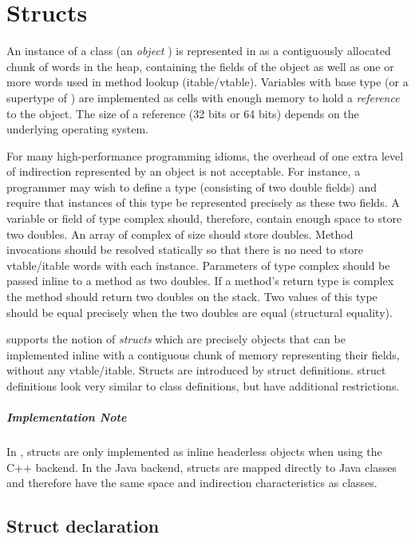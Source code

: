 \chapter{Structs}
\label{XtenStructs}
\label{StructClasses}
\label{Structs}

An instance of a class  (an \emph{object} ) is represented in \Xten{} as
a contiguously allocated chunk of words in the heap, containing the
fields of the object as well as one or more words used in method
lookup (itable/vtable). Variables with base type  (or a supertype of
) are implemented as cells with enough memory to hold a
\emph{reference} to the object. The size of a reference (32 bits or 64
bits) depends on the underlying operating system.


For many high-performance programming idioms, the overhead of one
extra level of indirection represented by an object is not
acceptable. For instance, a programmer may wish to define a type
 (consisting of two double fields) and require that instances
of this type be represented precisely as these two fields. A variable
or field of type complex should, therefore, contain enough space to
store two doubles. An array of complex of size  should store 
doubles. Method invocations should be resolved statically so that
there is no need to store vtable/itable words with each
instance. Parameters of type complex should be passed inline to a
method as two doubles. If a method's return type is complex the method
should return two doubles on the stack. Two values of this type should
be equal precisely when the two doubles are equal (structural
equality).

\Xten{} supports the notion of \emph{structs} which are precisely
objects that can be implemented inline with a contiguous chunk of
memory representing their fields, without any vtable/itable. Structs
are introduced by struct definitions. struct definitions look very
similar to class definitions, but have additional restrictions.

\paragraph{Implementation Note} In \XtenCurrVer{}, structs are
only implemented as inline headerless objects when using the C++
backend. In the Java backend, structs are mapped directly to Java
classes and therefore have the same space and indirection
characteristics as classes. 

\section{Struct declaration}

